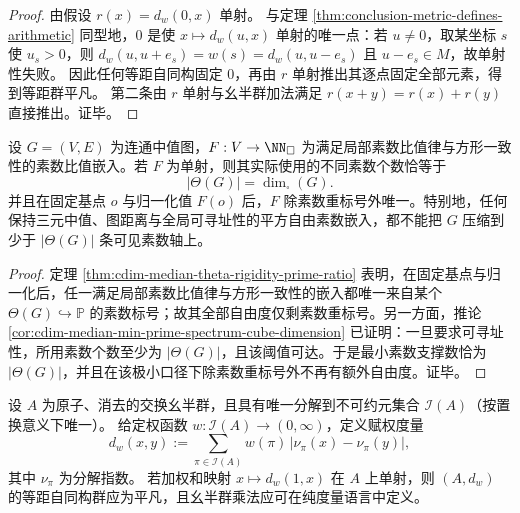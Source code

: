 \begin{proof}
由假设 \(r(x)=d_w(0,x)\) 单射。
与定理 \ref{thm:conclusion-metric-defines-arithmetic} 同型地，\(0\) 是使 \(x\mapsto d_w(u,x)\) 单射的唯一点：若 \(u\neq 0\)，取某坐标 \(s\) 使 \(u_s>0\)，则
\(
d_w(u,u+e_s)=w(s)=d_w(u,u-e_s)
\)
且 \(u-e_s\in M\)，故单射性失败。
因此任何等距自同构固定 \(0\)，再由 \(r\) 单射推出其逐点固定全部元素，得到等距群平凡。
第二条由 \(r\) 单射与幺半群加法满足 \(r(x+y)=r(x)+r(y)\) 直接推出。证毕。
\end{proof}

\begin{theorem}[中值几何的素数支撑极小刚性]\label{thm:conclusion-median-prime-support-minimal-rigidity}
设 \(G=(V,E)\) 为连通中值图，\(F:V\to\NN_{\square}\) 为满足局部素数比值律与方形一致性的素数比值嵌入。若 \(F\) 为单射，则其实际使用的不同素数个数恰等于
\[
|\Theta(G)|=\dim_{\square}(G).
\]
并且在固定基点 \(o\) 与归一化值 \(F(o)\) 后，\(F\) 除素数重标号外唯一。特别地，任何保持三元中值、图距离与全局可寻址性的平方自由素数嵌入，都不能把 \(G\) 压缩到少于 \(|\Theta(G)|\) 条可见素数轴上。
\end{theorem}
\begin{proof}
定理 \ref{thm:cdim-median-theta-rigidity-prime-ratio} 表明，在固定基点与归一化后，任一满足局部素数比值律与方形一致性的嵌入都唯一来自某个 \(\Theta(G)\hookrightarrow\mathbb P\) 的素数标号；故其全部自由度仅剩素数重标号。另一方面，推论 \ref{cor:cdim-median-min-prime-spectrum-cube-dimension} 已证明：一旦要求可寻址性，所用素数个数至少为 \(|\Theta(G)|\)，且该阈值可达。于是最小素数支撑数恰为 \(|\Theta(G)|\)，并且在该极小口径下除素数重标号外不再有额外自由度。证毕。
\end{proof}

\begin{conjecture}\label{conj:conclusion-ufm-metric-factor-rigidity}
设 \(A\) 为原子、消去的交换幺半群，且具有唯一分解到不可约元集合 \(\mathcal I(A)\)（按置换意义下唯一）。
给定权函数 \(w:\mathcal I(A)\to(0,\infty)\)，定义赋权度量
\[
d_w(x,y):=\sum_{\pi\in\mathcal I(A)} w(\pi)\,|\nu_\pi(x)-\nu_\pi(y)|,
\]
其中 \(\nu_\pi\) 为分解指数。
若加权和映射 \(x\mapsto d_w(1,x)\) 在 \(A\) 上单射，则 \((A,d_w)\) 的等距自同构群应为平凡，且幺半群乘法应可在纯度量语言中定义。
\end{conjecture}

\endinput
